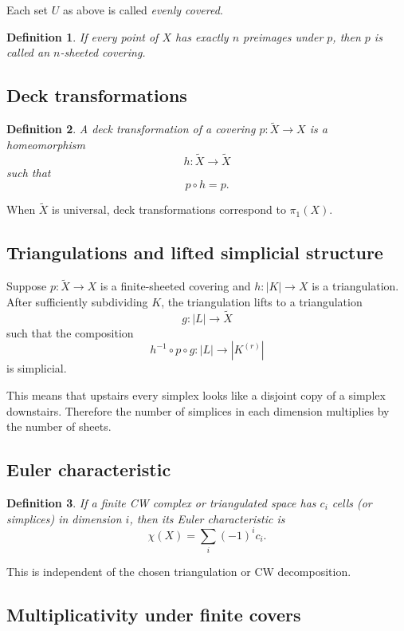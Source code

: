 \documentclass[12pt,a4paper]{article}
\newcommand{\Chi}{\chi}
\theoremstyle{notespace}
\newtheorem{definition}{Definition}[section]
\begin{document}
	Each set $U$ as above is called \emph{evenly covered}.
	
	\begin{definition}
		If every point of $X$ has exactly $n$ preimages under $p$, then $p$ is called an \emph{$n$-sheeted covering}.
	\end{definition}
	
	\subsection{Deck transformations}
	
	\begin{definition}
		A \emph{deck transformation} of a covering $p:\widetilde X\to X$ is a homeomorphism
		\[
		h:\widetilde X\to \widetilde X
		\]
		such that
		\[
		p\circ h=p.
		\]
	\end{definition}
	
	When $\widetilde X$ is universal, deck transformations correspond to $\pi_1(X)$.
	
	\subsection{Triangulations and lifted simplicial structure}
	
	Suppose $p:\widetilde X\to X$ is a finite-sheeted covering and $h:|K|\to X$ is a triangulation. After sufficiently subdividing $K$, the triangulation lifts to a triangulation
	\[
	g:|L|\to \widetilde X
	\]
	such that the composition
	\[
	h^{-1}\circ p\circ g:|L|\to |K^{(r)}|
	\]
	is simplicial.
	
	This means that upstairs every simplex looks like a disjoint copy of a simplex downstairs. Therefore the number of simplices in each dimension multiplies by the number of sheets.
	
	\subsection{Euler characteristic}
	
	\begin{definition}
		If a finite CW complex or triangulated space has $c_i$ cells (or simplices) in dimension $i$, then its \emph{Euler characteristic} is
		\[
		\Chi(X)=\sum_i (-1)^i c_i.
		\]
	\end{definition}
	
	This is independent of the chosen triangulation or CW decomposition.
	
	\subsection{Multiplicativity under finite covers}
	
\end{document}
